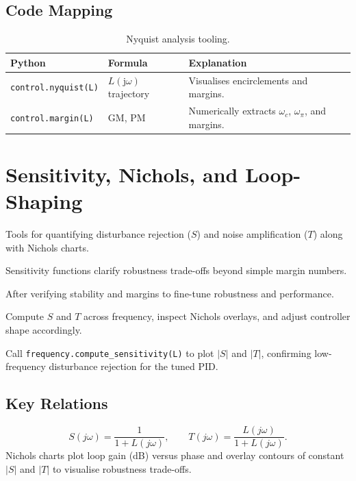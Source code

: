 \subsection{Code Mapping}
\begin{table}[h]
    \centering
    \small
    \renewcommand{\arraystretch}{1.2}
    \begin{tabularx}{\linewidth}{|>{\raggedright\arraybackslash}p{4cm}|X|X|}
        \hline
        \textbf{Python} & \textbf{Formula} & \textbf{Explanation} \\
        \hline
        \texttt{control.nyquist(L)} & $L(\mathrm{j}\omega)$ trajectory & Visualises encirclements and margins. \\
        \hline
        \texttt{control.margin(L)} & GM, PM & Numerically extracts $\omega_c$, $\omega_\pi$, and margins. \\
        \hline
    \end{tabularx}
    \caption{Nyquist analysis tooling.}
\end{table}

\section{Sensitivity, Nichols, and Loop-Shaping}
\begin{beginnerguide}
    \item[\textbf{What?}] Tools for quantifying disturbance rejection ($S$) and noise amplification ($T$) along with Nichols charts.
    \item[\textbf{Why?}] Sensitivity functions clarify robustness trade-offs beyond simple margin numbers.
    \item[\textbf{When?}] After verifying stability and margins to fine-tune robustness and performance.
    \item[\textbf{How?}] Compute $S$ and $T$ across frequency, inspect Nichols overlays, and adjust controller shape accordingly.
    \item[\textbf{Example}] Call \texttt{frequency.compute\_sensitivity(L)} to plot $|S|$ and $|T|$, confirming low-frequency disturbance rejection for the tuned PID.
\end{beginnerguide}
\subsection{Key Relations}
\[
    S(j\omega) = \frac{1}{1 + L(j\omega)}, \qquad T(j\omega) = \frac{L(j\omega)}{1 + L(j\omega)}.
\]
Nichols charts plot loop gain (dB) versus phase and overlay contours of constant $|S|$ and $|T|$ to visualise robustness trade-offs.

